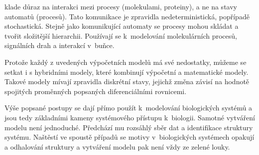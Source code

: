 \documentclass[a4paper]{article}
\begin{document}
klade důraz na interakci mezi procesy (molekulami, proteiny), a ne na stavy automatů (procesů).
Tato komunikace je zpravidla nedeterministická, popřípadě stochastická. Stejně jako komunikující automaty
se procesy mohou skládat a tvořit složitější hierarchii. Používají se k~modelování molekulárních
procesů, signálních drah a interakcí v~buňce\cite{Fisher}.
\par
Protože každý z uvedených výpočetních modelů má své nedostatky, můžeme se setkat i s hybridními modely,
které kombinují výpočetní a matematické modely. Takové modely mívají zpravidla
diskrétní stavy, jejichž změna závisí na hodnotě spojitých proměnných popsaných diferenciálními rovnicemi\cite{Fisher}.
\par
Výše popsané postupy se dají přímo použít k~modelování biologických systémů a jsou tedy
základními kameny systémového přístupu k~biologii. Samotné vytváření modelu není jednoduché.
Předchází mu rozsáhlý sběr dat a identifikace struktury systému.
Naštěstí ve spoustě případů se motivy v~biologických systémech opakují\cite{Alon}
a odhalování struktury a vytváření modelu pak není vždy ze zelené louky.



\end{document}
